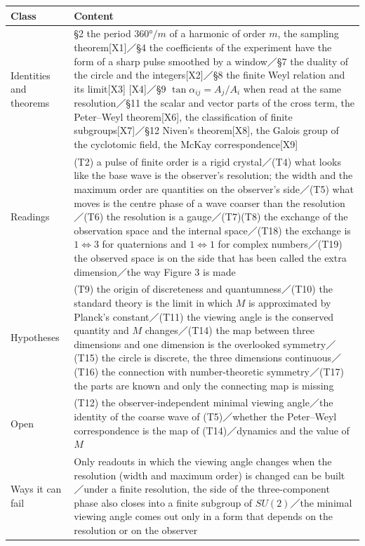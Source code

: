 \documentclass[
  a4paper,
]{article}
\newcounter{none} %
\begin{document}
{\def\LTcaptype{none} %
\begin{longtable}[]{@{}
  >{\raggedright\arraybackslash}p{}
  >{\raggedright\arraybackslash}p{}@{}}
\toprule\noalign{}
\begin{minipage}[b]{\linewidth}\raggedright
Class
\end{minipage} & \begin{minipage}[b]{\linewidth}\raggedright
Content
\end{minipage} \\
\midrule\noalign{}
\endhead
\bottomrule\noalign{}
\endlastfoot
Identities and theorems & §2 the period \(360°/m\) of a harmonic of
order \(m\), the sampling theorem{[}X1{]}／§4 the coefficients of the
experiment have the form of a sharp pulse smoothed by a window／§7 the
duality of the circle and the integers{[}X2{]}／§8 the finite Weyl
relation and its limit{[}X3{]} {[}X4{]}／§9 \(\tan\alpha_{ij}=A_j/A_i\)
when read at the same resolution／§11 the scalar and vector parts of the
cross term, the Peter--Weyl theorem{[}X6{]}, the classification of
finite subgroups{[}X7{]}／§12 Niven's theorem{[}X8{]}, the Galois group
of the cyclotomic field, the McKay correspondence{[}X9{]} \\
Readings & (T2) a pulse of finite order is a rigid crystal／(T4) what
looks like the base wave is the observer's resolution; the width and the
maximum order are quantities on the observer's side／(T5) what moves is
the centre phase of a wave coarser than the resolution／(T6) the
resolution is a gauge／(T7)(T8) the exchange of the observation space
and the internal space／(T18) the exchange is \(1\Leftrightarrow3\) for
quaternions and \(1\Leftrightarrow1\) for complex numbers／(T19) the
observed space is on the side that has been called the extra
dimension／the way Figure 3 is made \\
Hypotheses & (T9) the origin of discreteness and quantumness／(T10) the
standard theory is the limit in which \(M\) is approximated by Planck's
constant／(T11) the viewing angle is the conserved quantity and \(M\)
changes／(T14) the map between three dimensions and one dimension is the
overlooked symmetry／(T15) the circle is discrete, the three dimensions
continuous／(T16) the connection with number-theoretic symmetry／(T17)
the parts are known and only the connecting map is missing \\
Open & (T12) the observer-independent minimal viewing angle／the
identity of the coarse wave of (T5)／whether the Peter--Weyl
correspondence is the map of (T14)／dynamics and the value of \(M\) \\
Ways it can fail & Only readouts in which the viewing angle changes when
the resolution (width and maximum order) is changed can be built／under
a finite resolution, the side of the three-component phase also closes
into a finite subgroup of \(SU(2)\)／the minimal viewing angle comes out
only in a form that depends on the resolution or on the observer \\
\end{longtable}
}
\end{document}
